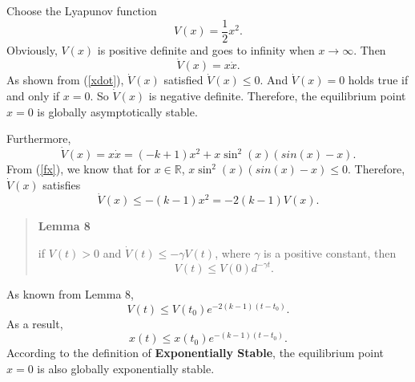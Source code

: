 \documentclass[12pt,a4paper]{article}
\begin{document}
\indent Choose the Lyapunov function
\begin{equation}
V(x)=\frac{1}{2}x^2.
\end{equation}
Obviously, $V(x)$ is positive definite and goes to infinity when $x\rightarrow\infty$. Then
\begin{equation}
\dot{V}(x)=x\dot{x}.
\end{equation}
As shown from (\ref{xdot}), $\dot{V}(x)$ satisfied $\dot{V}(x)\le 0$. And $\dot{V}(x)=0$ holds true if and only if $x=0$. So $\dot{V}(x)$ is negative definite. Therefore, the equilibrium point $x=0$ is globally asymptotically stable.

\indent Furthermore,
\begin{equation}
\dot{V}(x)=x\dot{x}=(-k+1)x^2+x\sin^2(x)(sin(x)-x).
\end{equation}
From (\ref{fx}), we know that for $x\in{\mathbb R}$, $x\sin^2(x)(sin(x)-x)\le 0$. Therefore, $\dot{V}(x)$ satisfies
\begin{equation}
\dot{V}(x)\le -(k-1)x^2=-2(k-1)V(x).
\end{equation}

\begin{tcolorbox}[width=\textwidth]
\begin{quote}
{\bf Lemma 8}

if $V(t)>0$ and $\dot{V}(t)\le -\gamma V(t)$, where $\gamma$ is a positive constant, then
$$ V(t)\le V(0)d^{-\gamma t}. $$
\end{quote}
\end{tcolorbox}
As known from Lemma 8,
\begin{equation}
V(t)\le V(t_0)e^{-2(k-1)(t-t_0)}.
\end{equation}
As a result,
\begin{equation}
x(t)\le x(t_0)e^{-(k-1)(t-t_0)}.
\end{equation}
According to the definition of {\bf Exponentially Stable}, the equilibrium point $x=0$ is also globally exponentially stable.
\end{document}
